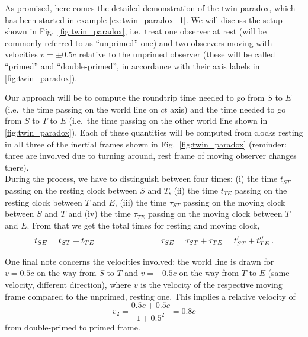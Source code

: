 \documentclass[../relativity_main.tex]{subfiles}
\begin{document}
\begin{ex}\label{ex:twin_paradox_2}
	As promised, here comes the detailed demonstration of the twin paradox, which has been started in example \ref{ex:twin_paradox_1}. We will discuss the setup shown in Fig.~\ref{fig:twin_paradox}, i.e.~treat one observer at rest (will be commonly referred to as \enquote{unprimed} one) and two observers moving with velocities $v = \pm 0.5 c$ relative to the unprimed observer (these will be called \enquote{primed} and \enquote{double-primed}, in accordance with their axis labels in \ref{fig:twin_paradox}).
	
	Our approach will be to compute the roundtrip time needed to go from $S$ to $E$ (i.e.~the time passing on the world line on $ct$ axis) and the time needed to go from $S$ to $T$ to $E$ (i.e.~the time passing on the other world line shown in \ref{fig:twin_paradox}). Each of these quantities will be computed from clocks resting in all three of the inertial frames shown in Fig.~\ref{fig:twin_paradox} (reminder: three are involved due to turning around, rest frame of moving observer changes there).\\
	
	
	During the process, we have to distinguish between four times: (i) the time $t_{ST}$ passing on the resting clock between $S$ and $T$, (ii) the time $t_{TE}$ passing on the resting clock between $T$ and $E$, (iii) the time $\tau_{ST}$ passing on the moving clock between $S$ and $T$ and (iv) the time $\tau_{TE}$ passing on the moving clock between $T$ and $E$. From that we get the total times for resting and moving clock,
	\begin{equation*}
		t_{SE} = t_{ST} + t_{TE}
		\qquad \qquad \qquad \qquad
		\tau_{SE} = \tau_{ST} + \tau_{TE} = t'_{ST} + t''_{TE} \, .
	\end{equation*}
	
	One final note concerns the velocities involved: the world line is drawn for $v = 0.5 c$ on the way from $S$ to $T$ and $v = -0.5 c$ on the way from $T$ to $E$ (same velocity, different direction), where $v$ is the velocity of the respective moving frame compared to the unprimed, resting one. This implies a relative velocity of
	\begin{equation*}
		v_2 = \frac{0.5 c + 0.5 c}{1 + 0.5^2} = 0.8 c
	\end{equation*}
	from double-primed to primed frame.
	

\end{ex}
\end{document}
